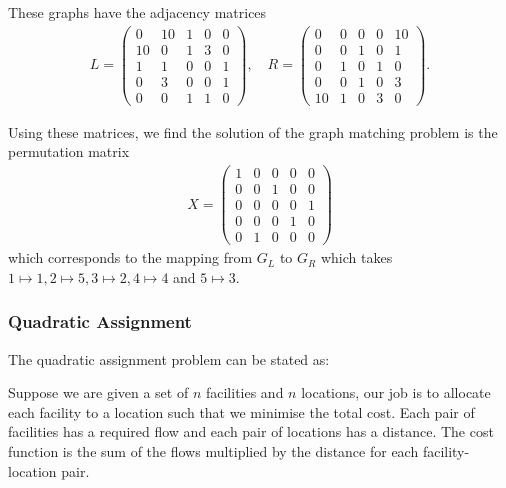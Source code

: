 \documentclass{article}
\begin{document}
\noindent These graphs have the adjacency matrices
\begin{align*}
    L = \begin{pmatrix}
        0 & 10 & 1 & 0 & 0 \\
        10 & 0 & 1 & 3 & 0 \\
        1 & 1 & 0 & 0 & 1 \\
        0 & 3 & 0 & 0 & 1 \\
        0 & 0 & 1 & 1 & 0
    \end{pmatrix}, \quad R = \begin{pmatrix}
        0 & 0 & 0 & 0 & 10 \\
        0 & 0 & 1 & 0 & 1 \\
        0 & 1 & 0 & 1 & 0 \\
        0 & 0 & 1 & 0 & 3 \\
        10 & 1 & 0 & 3 & 0
    \end{pmatrix}.
\end{align*}

\noindent Using these matrices, we find the solution of the graph matching problem is the permutation matrix
\begin{align*}
    X = \begin{pmatrix}
        1 & 0 & 0 & 0 & 0 \\
        0 & 0 & 1 & 0 & 0 \\
        0 & 0 & 0 & 0 & 1 \\
        0 & 0 & 0 & 1 & 0 \\
        0 & 1 & 0 & 0 & 0
    \end{pmatrix}
\end{align*}
which corresponds to the mapping from \(G_L\) to \(G_R\) which takes \(1 \mapsto 1, 2 \mapsto 5, 3 \mapsto 2, 4 \mapsto 4\) and \(5 \mapsto 3\).

\subsubsection{Quadratic Assignment}

The quadratic assignment problem can be stated as:

Suppose we are given a set of \(n\) facilities and \(n\) locations, our job is to allocate each facility to a location such that we minimise the total cost. Each pair of facilities has a required flow and each pair of locations has a distance. The cost function is the sum of the flows multiplied by the distance for each facility-location pair.\\
\end{document}
